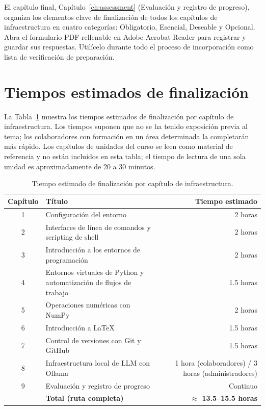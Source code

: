 \begin{landscape}
El capítulo final, Capítulo~\ref{ch:assessment} (Evaluación y registro de
progreso), organiza los elementos clave de finalización de todos los capítulos de infraestructura
en cuatro categorías: Obligatorio, Esencial, Deseable y Opcional. Abra
el formulario PDF rellenable en Adobe Acrobat Reader para registrar y guardar sus
respuestas. Utilícelo durante todo el proceso de incorporación como lista de verificación de preparación.

\newpage
\section*{Tiempos estimados de finalización}

La Tabla~\ref{tab:times} muestra los tiempos estimados de finalización por capítulo
de infraestructura. Los tiempos suponen que no se ha tenido exposición previa al tema; los colaboradores con
formación en un área determinada la completarán más rápido. Los capítulos de unidades del curso
se leen como material de referencia y no están incluidos en esta tabla; el tiempo de lectura
de una sola unidad es aproximadamente de 20 a 30 minutos.

\begin{table}[htbp]
\centering
\caption{Tiempo estimado de finalización por capítulo de infraestructura.}
\label{tab:times}
\begin{tabular}{clr}
\toprule
\textbf{Capítulo} & \textbf{Título} & \textbf{Tiempo estimado} \\
\midrule
1  & Configuración del entorno                              & 2 horas \\
2  & Interfaces de línea de comandos y scripting de shell    & 2 horas \\
3  & Introducción a los entornos de programación       & 2 horas \\
4  & Entornos virtuales de Python y automatización de flujos de trabajo & 1.5 horas \\
5  & Operaciones numéricas con NumPy                & 2 horas \\
6  & Introducción a \LaTeX{}                       & 1.5 horas \\
7  & Control de versiones con Git y GitHub            & 1.5 horas \\
8  & Infraestructura local de LLM con Ollama           & 1 hora (colaboradores) / 3 horas (administradores) \\
9  & Evaluación y registro de progreso                 & Continuo \\
\midrule
   & \textbf{Total (ruta completa)}                     & \textbf{$\approx$ 13.5--15.5 horas} \\
\bottomrule
\end{tabular}
\end{table}

\end{landscape}

